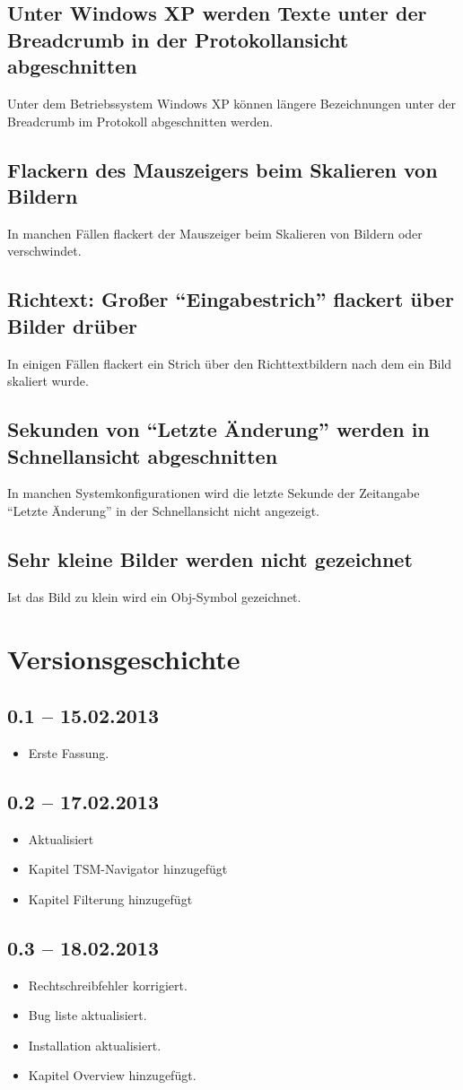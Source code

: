 \documentclass[11pt,a4paper,titlepage]{article}
\begin{document}
\subsection*{Unter Windows XP werden Texte unter der Breadcrumb in der Protokollansicht abgeschnitten}
Unter dem Betriebssystem Windows XP können längere Bezeichnungen unter der Breadcrumb im Protokoll abgeschnitten werden.

\subsection*{Flackern des Mauszeigers beim Skalieren von Bildern}
In manchen Fällen flackert der Mauszeiger beim Skalieren von Bildern oder verschwindet.

\subsection*{Richtext: Großer "`Eingabestrich"' flackert über Bilder drüber}
In einigen Fällen flackert ein Strich über den Richttextbildern nach dem ein Bild skaliert wurde.

\subsection*{Sekunden von "`Letzte Änderung"' werden in Schnellansicht abgeschnitten}
In manchen Systemkonfigurationen wird die letzte Sekunde der Zeitangabe "`Letzte Änderung"' in der Schnellansicht nicht angezeigt.

\subsection*{Sehr kleine Bilder werden nicht gezeichnet}
Ist das Bild zu klein wird ein Obj-Symbol gezeichnet.


\section{Versionsgeschichte}

\subsection*{0.1 -- 15.02.2013}
\begin{itemize}
 \item Erste Fassung.
\end{itemize}

\subsection*{0.2 -- 17.02.2013}
\begin{itemize}
 \item Aktualisiert
 \item Kapitel TSM-Navigator hinzugefügt
 \item Kapitel Filterung hinzugefügt
\end{itemize}
 
\subsection*{0.3 -- 18.02.2013}
\begin{itemize}
 \item Rechtschreibfehler korrigiert.
 \item Bug liste aktualisiert.
 \item Installation aktualisiert.
 \item Kapitel Overview hinzugefügt.
\end{itemize}
 
\end{document}
